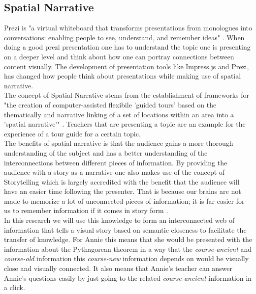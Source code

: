 \documentclass[twoside, 12pt]{article}
\begin{document}
\subsection{Spatial Narrative}
\label{sec:spatialnarrative}

Prezi is "a virtual whiteboard that transforms presentations from monologues into conversations: enabling people to see, understand, and remember ideas" \cite{Prezi:npentrel14}. When doing a good prezi presentation one has to understand the topic one is presenting on a deeper level and think about how one can portray connections between content visually. The development of presentation tools like Impress.js and Prezi, has changed how people think about presentations while making use of spatial narrative.\\

The concept of Spatial Narrative stems from the establishment of frameworks for "the creation of computer-assisted flexibile 'guided tours' based on the thematically and narrative linking of a set of locations within an area into a 'spatial narrative'" \cite{SpatialNarratives:npentrel14}. Teachers that are presenting a topic are an example for the experience of a tour guide for a certain topic.\\

The benefits of spatial narrative is that the audience gains a more thorough understanding of the subject and has a better understanding of the interconnections between different pieces of information. By providing the audience with a story as a narrative one also makes use of the concept of Storytelling which is largely accredited with the benefit that the audience will have an easier time following the presenter. That is because our brains are not made to memorize a lot of unconnected pieces of information; it is far easier for us to remember information if it comes in story form \cite{Storytelling:npentrel14}.\\

In this research we will use this knowledge to form an interconnected web of information that tells a visual story based on semantic closeness to facilitate the transfer of knowledge. For Annie this means that she would be presented with the information about the Pythagorean theorem in a way that the \textit{course-ancient} and \textit{course-old} information this \textit{course-new} information depends on would be visually close and visually connected. It also means that Annie's teacher can answer Annie's questions easily by just going to the related \textit{course-ancient} information in a click.\\
\end{document}
